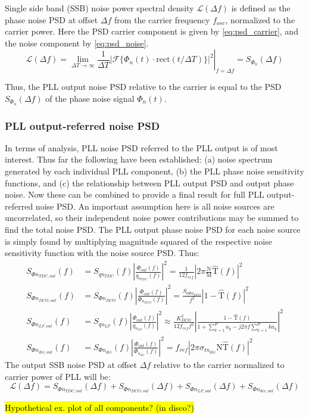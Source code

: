 	 Single side band (SSB) noise power spectral density $\mathcal{L}(\Delta f)$ is defined as the phase noise PSD at offset $\Delta f$ from the carrier frequency $f_{osc}$, normalized to the carrier power. Here the PSD carrier component is given by \ref{eq:psd_carrier}, and the noise component by \ref{eq:psd_noise}.
	\begin{equation}
		\mathcal{L}(\Delta f) = \left.\lim_{\Delta T\rightarrow\infty}\frac{1}{\Delta T}|\mathcal{F}\{\Phi_{n}(t)\cdot\mathrm{rect}(t/\Delta T)\}|^2 \right|_{f=\Delta f}= S_{\Phi_{n}}(\Delta f)
	\end{equation}

	Thus, the PLL output noise PSD relative to the carrier is equal to the PSD $S_{\Phi_{n}}(\Delta f)$ of the phase noise signal $\Phi_{n}(t)$.

\subsubsection{PLL output-referred noise PSD}
In terms of analysis, PLL noise PSD referred to the PLL output is of most interest. Thus far the following have been established: (a) noise spectrum generated by each individual PLL component, (b) the PLL phase noise sensitivity functions, and (c) the relationship between PLL output PSD and output phase noise. Now these can be combined to provide a final result for full PLL output-referred noise PSD. An important assumption here is all noise sources are uncorrelated, so their independent noise power contributions may be summed to find the total noise PSD. The PLL output phase noise PSD for each noise source is simply found by multiplying magnitude squared of the respective noise sensitivity function with the noise source PSD. Thus:
\begin{align}
	S_{\Phi n_{TDC,out}}(f) &= S_{qn_{TDC}}(f)\left|\frac{\Phi_{out}(f)}{q_{n_{TDC}}(f)}\right|^2 = \frac{1}{12f_{ref}}\left|2\pi\frac{\mathrm{N}}{\mathrm{M}}\hat{\mathrm{T}}(f)\right|^2\\
	S_{\Phi n_{DCO,out}}(f) &= S_{\Phi n_{DCO}}(f)\left|\frac{\Phi_{out}(f)}{\Phi_{n_{DCO}}(f)}\right|^2  = \frac{S_{0\Phi n_{DCO}}}{f^2}\left|1-\hat{\mathrm{T}}(f)\right|^2\\		
	S_{\Phi n_{LF,out}}(f) &= S_{q n_{LF}}(f)\left|\frac{\Phi_{out}(f)}{q_{n_{LF}}(f)}\right|^2 \approx \frac{K_{DCO}^2}{12f_{ref}f^2}\left|\frac{1-\hat{\mathrm{T}}(f)}{1+\sum_{k=1}^P a_k - j2\pi f\sum_{k=1}^P ka_k}\right|^2\\
	S_{\Phi n_{div,out}}(f) &= S_{\Phi n_{div}}(f)\left|\frac{\Phi_{out}(f)}{\Phi_{n_{div}}(f)}\right|^2 = f_{ref}\left|2\pi\sigma_{tn_{div}}\mathrm{N}\hat{\mathrm{T}}(f)\right|^2
\end{align}
The output SSB noise PSD at offset $\Delta f$ relative to the carrier normalized to carrier power of PLL will be:
\begin{equation}
	\mathcal{L}(\Delta f) = S_{\Phi n_{TDC,out}}(\Delta f) + S_{\Phi n_{DCO,out}}(\Delta f) + S_{\Phi n_{LF,out}}(\Delta f) + S_{\Phi n_{div,out}}(\Delta f)
\end{equation}



\hl{Hypothetical ex. plot of all components? (in disco?)}



